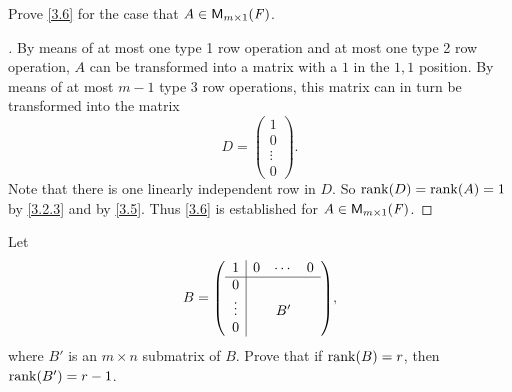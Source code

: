 \setcounter{ex}{9}
\begin{ex}\label{ex:3.2.10}
  Prove \cref{3.6} for the case that \(A \in \mathsf{M}_{{m} \times 1}({\mathit{F}})\).
\end{ex}

\begin{proof}[]
  By means of at most one type 1 row operation and at most one type 2 row operation, \(A\) can be transformed into a matrix with a \(1\) in the \(1,1\) position.
  By means of at most \(m - 1\) type 3 row operations, this matrix can in turn be transformed into the matrix
  \[
    D = \begin{pmatrix}
      1      \\
      0      \\
      \vdots \\
      0
    \end{pmatrix}.
  \]
  Note that there is one linearly independent row in \(D\).
  So \(\rk{D} = \rk{A} = 1\) by \cref{3.2.3} and by \cref{3.5}.
  Thus \cref{3.6} is established for \(A \in \mathsf{M}_{{m} \times 1}({\mathit{F}})\).
\end{proof}

\begin{ex}\label{ex:3.2.11}
  Let
  \[
    B = \pa{\begin{array}{c|ccc}
        1      & 0 & \cdots & 0 \\
        \hline
        0      &   &        &   \\
        \vdots &   & B'     &   \\
        0      &   &        &
      \end{array}},
  \]
  where \(B'\) is an \(m \times n\) submatrix of \(B\).
  Prove that if \(\rk{B} = r\), then \(\rk{B'} = r - 1\).
\end{ex}

